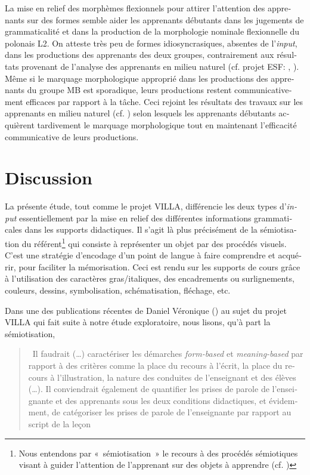 \documentclass[output=paper]{langscibook}
\begin{document}
\begin{otherlanguage}{french}
La mise en relief des morphèmes flexionnels pour attirer l’attention des apprenants sur des formes semble aider les apprenants débutants dans les jugements de grammaticalité et dans la production de la morphologie nominale flexionnelle du polonais L2. On atteste très peu de formes idiosyncrasiques, absentes de l’\textit{input}, dans les productions des apprenants des deux groupes, contrairement aux résultats provenant de l’analyse des apprenants en milieu naturel (cf. projet ESF: \citealt{Perdue1993}, \citealt{WatorekEtAl2009}). Même si le marquage morphologique approprié dans les productions des apprenants du groupe MB est sporadique, leurs productions restent communicativement efficaces par rapport à la tâche. Ceci rejoint les résultats des travaux sur les apprenants en milieu naturel (cf. \citealt{Perdue1993}) selon lesquels les apprenants débutants acquièrent tardivement le marquage morphologique tout en maintenant l’efficacité communicative de leurs productions. 


\section{Discussion}\label{sec:watorek:6}

La présente étude, tout comme le projet VILLA, différencie les deux types d’\textit{input} essentiellement par la mise en relief des différentes informations grammaticales dans les supports didactiques. Il s’agit là plus précisément de la sémiotisation du référent\footnote{Nous entendons par «~sémiotisation~» le recours à des procédés sémiotiques visant à guider l’attention de l’apprenant sur des objets à apprendre (cf. \cite{Schneuwly2000})} qui consiste à représenter un objet par des procédés visuels. C’est une stratégie d'encodage d'un point de langue à faire comprendre et acquérir, pour faciliter la mémorisation. Ceci est rendu sur les supports de cours grâce à l’utilisation des caractères gras/italiques, des encadrements ou surlignements, couleurs, dessins, symbolisation, schématisation, fléchage, etc.

Dans une des publications récentes de Daniel Véronique (\citealt[173]{Véronique2021}) au sujet du projet VILLA qui fait suite à notre étude exploratoire, nous lisons, qu’à part la sémiotisation, 
\begin{quote}
    ~Il faudrait (…) caractériser les démarches \textit{form-based} et \textit{meaning-based} par rapport à des critères comme la place du recours à l’écrit, la place du recours à l’illustration, la nature des conduites de l’enseignant et des élèves (…). Il conviendrait également de quantifier les prises de parole de l’enseignante et des apprenants sous les deux conditions didactiques, et évidemment, de catégoriser les prises de parole de l’enseignante par rapport au script de la leçon~
\end{quote}


\end{otherlanguage}
\end{document}
